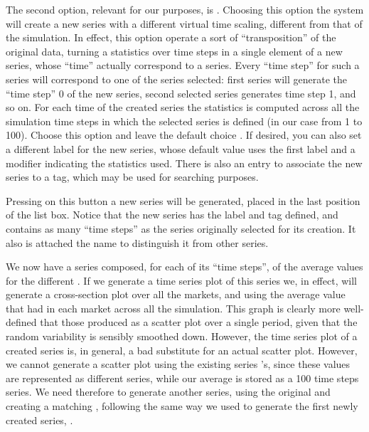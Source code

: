 \documentclass [11pt,a4paper] {book}
\begin{document}
The second option, relevant for our purposes, is . Choosing this option the system will create a new series with a different virtual time scaling, different from that of the simulation. In effect, this option operate a sort of ``transposition'' of the original data, turning a statistics over time steps in a single element of a new series, whose ``time'' actually correspond to a series. Every ``time step'' for such a series will correspond to one of the series selected: first series will generate the ``time step'' 0 of the new series, second selected series generates time step 1, and so on. For each time of the created series the statistics is computed across all the simulation time steps in which the selected series is defined (in our case from 1 to 100). Choose this option and leave the default choice . If desired, you can also set a different label for the new series, whose default value uses the first label and a modifier indicating the statistics used. There is also an entry to associate the new series to a tag, which may be used for searching purposes.

Pressing  on this button a new series will be generated, placed in the last position of the  list box. Notice that the new series has the label and tag defined, and contains as many ``time steps'' as the series originally selected for its creation. It also is attached the name  to distinguish it from other series.

We now have a series composed, for each of its ``time steps'', of the average values for the different . If we generate a time series plot of this series we, in effect, will generate a cross-section plot over all the markets, and using the average value that  had in each market across all the simulation. This graph is clearly more well-defined that those produced as a scatter plot over a single period, given that the random variability is sensibly smoothed down. However, the time series plot of a created series is, in general, a bad substitute for an actual scatter plot. However, we cannot generate a scatter plot using the existing series 's, since these values are represented as different series, while our average  is stored as a 100 time steps series. We need therefore to generate another series, using the original  and creating a matching , following the same way we used to generate the first newly created series, . 
\end{document}
